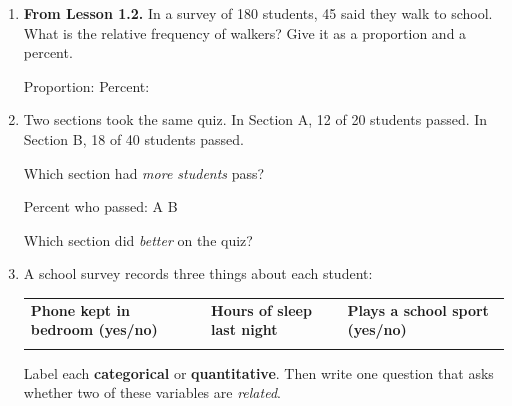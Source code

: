 \documentclass[12pt]{article}
\begin{document}

\vspace{0.28in}

\begin{enumerate}[leftmargin=1.9em, itemsep=0.80in]

  \item \textbf{From Lesson 1.2.} In a survey of 180 students, 45 said they walk to school.
        What is the relative frequency of walkers? Give it as a proportion and a percent.

        \vspace{16pt}
        Proportion:  \qquad Percent: 

  \item Two sections took the same quiz. In Section A, 12 of 20 students passed. In Section B,
        18 of 40 students passed.

        \vspace{12pt}
        Which section had \emph{more students} pass? 
        \vspace{16pt}

        Percent who passed: \quad A  \qquad B 
        \vspace{16pt}

        Which section did \emph{better} on the quiz? 

  \item A school survey records three things about each student:
        \vspace{10pt}

        \renewcommand{\arraystretch}{1.5}
        \begin{tabularx}{\linewidth}{@{} Y Y Y @{}}
        \textbf{Phone kept in bedroom (yes/no)} & \textbf{Hours of sleep last night} &
        \textbf{Plays a school sport (yes/no)} \\
         &  &  \\
        \end{tabularx}

        \vspace{6pt}
        Label each \textbf{categorical} or \textbf{quantitative}. Then write one question that
        asks whether two of these variables are \emph{related}.\\[18pt]
        \\[18pt]

\end{enumerate}
\end{document}
